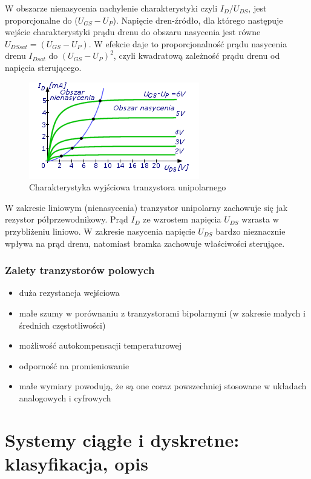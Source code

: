 \documentclass[a4paper,twoside]{report}
\begin{document}
W obszarze nienasycenia nachylenie charakterystyki czyli $I_D/U_{DS}$, jest proporcjonalne do ($U_{GS}- U_P$). Napięcie dren-źródło, dla którego następuje wejście charakterystyki prądu drenu do obszaru nasycenia jest równe $U_{DSsat}=(U_{GS}- U_P)$. W efekcie daje to proporcjonalność prądu nasycenia drenu $I_{Dsat}$ do $(U_{GS}- U_P)^2$, czyli kwadratową zależność prądu drenu od napięcia sterującego.


\begin{figure}[htbp]
\centering
\includegraphics[scale=0.9]{obrazy/tranzystory/tranunichar6.png}
\caption{Charakterystyka wyjściowa tranzystora unipolarnego}
\label{rys:tranUniChWyj}
\end{figure}

W zakresie liniowym (nienasycenia) tranzystor unipolarny zachowuje się jak rezystor półprzewodnikowy. Prąd $I_D$ ze wzrostem napięcia $U_{DS}$ wzrasta w przybliżeniu liniowo.
W zakresie nasycenia napięcie $U_{DS}$ bardzo nieznacznie wpływa na prąd drenu, natomiast bramka zachowuje właściwości sterujące.

\subsubsection{Zalety tranzystorów polowych}
\begin{itemize}
\item duża rezystancja wejściowa
\item małe szumy w porównaniu z tranzystorami bipolarnymi (w zakresie małych i średnich częstotliwości)
\item możliwość autokompensacji temperaturowej
\item odporność na promieniowanie
\item małe wymiary powodują, że są one coraz powszechniej stosowane w układach analogowych i cyfrowych
\end{itemize}

\section{Systemy ciągłe i dyskretne: klasyfikacja, opis}
\end{document}
